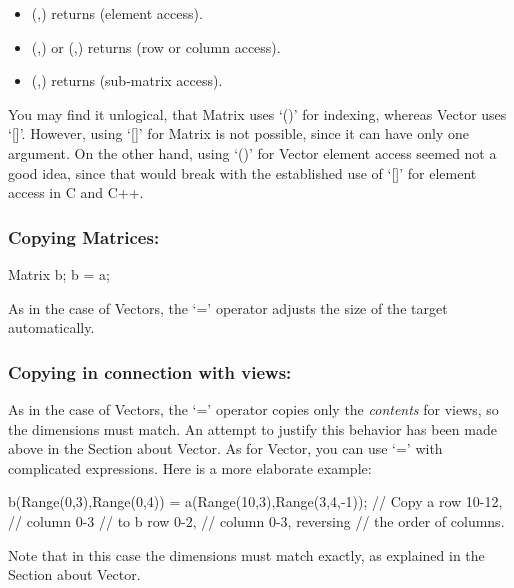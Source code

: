 \begin{itemize}
\item (,) returns  (element access).
\item (,) or (,) returns
   (row or column access).
\item (,) returns 
  (sub-matrix access).
\end{itemize}

You may find it unlogical, that Matrix uses `()' for indexing, whereas
Vector uses `[]'. However, using `[]' for Matrix is not possible,
since it can have only one argument. On the other hand, using `()' for
Vector element access seemed not a good idea, since that would break
with the established use of `[]' for element access in C and C++.

\subsubsection{Copying Matrices:}
\begin{code}
Matrix b;
b = a;
\end{code}

As in the case of Vectors, the `=' operator adjusts the size of the
target automatically.

\subsubsection{Copying in connection with views:}

As in the case of Vectors, the `=' operator copies only the
\emph{contents} for views, so the dimensions must match. An attempt to justify
this behavior has been made above in the Section about Vector. As for
Vector, you can use `=' with complicated expressions. Here is a more
elaborate example:

\begin{code}
b(Range(0,3),Range(0,4)) =
   a(Range(10,3),Range(3,4,-1)); // Copy a row 10-12,
                                 // column 0-3
                                 // to b row 0-2,
                                 // column 0-3, reversing
                                 // the order of columns.
\end{code}
Note that in this case the dimensions must match exactly, as explained
in the Section about Vector.

